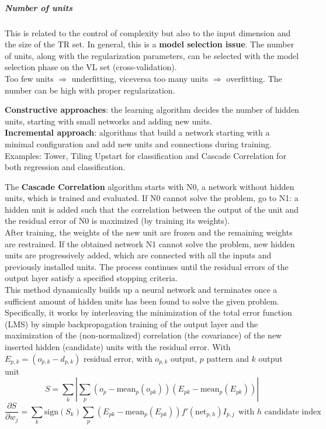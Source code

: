 \documentclass[10pt]{report}
\begin{document}
\subparagraph{Number of units} This is related to the control of complexity but also to the input dimension and the size of the TR set. In general, this is a \textbf{model selection issue}. The number of units, along with the regularization parameters, can be selected with the model selection phase on the VL set (cross-validation).\\
Too few units $\Rightarrow$ underfitting, viceversa too many units $\Rightarrow$ overfitting. The number can be high with proper regularization.
\begin{list}{}{}
	\item \textbf{Constructive approaches}: the learning algorithm decides the number of hidden units, starting with small networks and adding new units.\\
	\textbf{Incremental approach}: algorithms that build a network starting with a minimal configuration and add new units and connections during training. Examples: Tower, Tiling Upstart for classification and Cascade Correlation for both regression and classification.
	\begin{list}{}{}
		\item The \textbf{Cascade Correlation} algorithm starts with N0, a network without hidden units, which is trained and evaluated. If N0 cannot solve the problem, go to N1: a hidden unit is added such that the correlation between the output of the unit and the residual error of N0 is maximized (by training its weights).\\
		After training, the weights of the new unit are frozen and the remaining weights are restrained. If the obtained network N1 cannot solve the problem, new hidden units are progressively added, which are connected with all the inputs and previously installed units. The process continues until the residual errors of the output layer satisfy a specified stopping criteria.\\
		This method dynamically builds up a neural network and terminates once a sufficient amount of hidden units has been found to solve the given problem. Specifically, it works by interleaving the minimization of the total error function (LMS) by simple backpropagation training of the output layer and the maximization of the (non-normalized) correlation (the covariance) of the new inserted hidden (candidate) units with the residual error. With $E_{p,k} = (o_{p,k} - d_{p,k})$ residual error, with $o_{p,k}$ output, $p$ pattern and $k$ output unit
		$$S = \sum_k|\sum_p(o_p - \text{mean}_p(o_{pk}))(E_{pk} - \text{mean}_p(E_{pk}))|$$
		$$\frac{\partial S}{\partial w_j} = \sum_k \text{sign}(S_k)\sum_p(E_{pk} - \text{mean}_p(E_{pk}))f'(\text{net}_{p,h})I_{p,j}\:\:\text{with }h\text{ candidate index}$$

\end{list}
\end{list}
\end{document}

